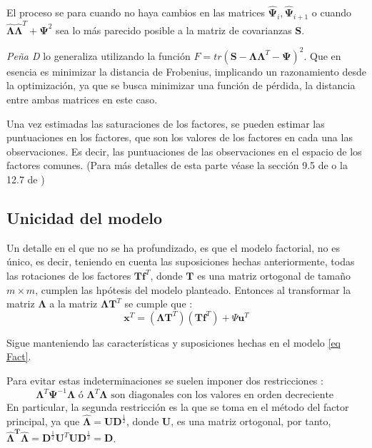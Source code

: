 \noindent El proceso se para cuando no haya cambios en las matrices $\mathbf{\hat{\Psi}}_i,\mathbf{\hat{\Psi}}_{i+1}$ o cuando $\mathbf{\hat{\Lambda}}\mathbf{\hat{\Lambda}}^T+\mathbf{\Psi}^2$ sea lo más parecido posible a la matriz de covarianzas $\mathbf{S}$.

\noindent \emph{Peña D} \cite{Peña 2002} lo generaliza utilizando la función $F=tr(\mathbf{S}-\mathbf{\Lambda}\mathbf{\Lambda}^T-\mathbf{\Psi})^2$. Que en esencia es minimizar la distancia de Frobenius, implicando un razonamiento desde la optimización, ya que se busca minimizar  una función de pérdida, la distancia entre ambas matrices en este caso. 

\noindent Una vez estimadas las saturaciones de los factores, se pueden estimar las puntuaciones en los factores, que son los valores de los factores en cada una las observaciones. Es decir, las  puntuaciones de las observaciones en el espacio de los factores comunes. (Para más detalles de esta parte véase  la sección 9.5 de \cite{Johnson 2007} o la 12.7 de \cite{Peña 2002})

\subsection{Unicidad del modelo}

\noindent Un detalle en el que no se ha profundizado, es que el modelo factorial, no es único, es decir, teniendo en cuenta las suposiciones hechas anteriormente, todas las rotaciones de los factores $\mathbf{Tf}^T$, donde $\mathbf{T}$ es una matriz ortogonal de tamaño $m\times m$, cumplen las hpótesis del modelo planteado. Entonces al transformar la matriz $\mathbf{\Lambda}$ a la matriz $\mathbf{\Lambda T}^T$ se cumple que \cite{Mardia 1979}:
\begin{equation}
\mathbf{x}^T=(\mathbf{\Lambda T}^T)(\mathbf{Tf}^T)+\Psi\mathbf{u}^T
\end{equation}

\noindent Sigue manteniendo las características y suposiciones hechas en el modelo \ref{eq Fact}.

\noindent Para evitar estas indeterminaciones se suelen imponer dos restricciones \cite{Mardia 1979}:
\begin{equation}
\mathbf{\Lambda}^T \mathbf{\Psi}^{-1}\mathbf{\Lambda} \text{ ó } \mathbf{\Lambda}^T \mathbf{\Lambda} \text{ son diagonales con los valores en orden decreciente }
\end{equation}
\noindent En particular, la segunda restricción es la que se toma en el método del factor principal, ya que $\mathbf{\hat{\Lambda}}=\mathbf{UD}^{\frac{1}{2}}$, donde $\mathbf{U}$, es una matriz ortogonal, por tanto, $\mathbf{\hat{\Lambda}^T \hat{\Lambda}}=\mathbf{D}^{\frac{1}{2}}\mathbf{U}^T\mathbf{U}\mathbf{D}^{\frac{1}{2}}=\mathbf{D}$. 

